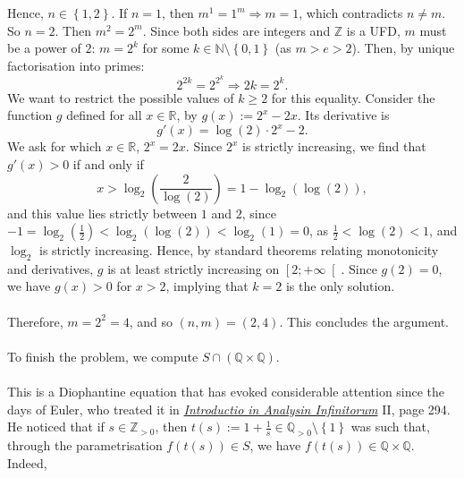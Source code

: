 \begin{solution}
    \\\\
    Hence, \( n \in \left\{ 1,2 \right\} \). If \( n = 1 \), then \( m^1 = 1^m \Rightarrow m = 1 \), which contradicts \( n \neq m \). So \( n = 2 \). Then \( m^2 = 2^m \). Since both sides are integers and \( \mathbb{Z} \) is a UFD, \( m \) must be a power of \( 2 \): \( m = 2^k \) for some \( k \in \mathbb{N} \setminus \left\{ 0,1 \right\} \) (as \( m > e > 2 \)). Then, by unique factorisation into primes:
    \[
        2^{2k} = 2^{2^k} \Rightarrow 2k = 2^k.
    \]
    We want to restrict the possible values of \( k\geq 2 \) for this equality. Consider the function \( g \) defined for all \( x \in \mathbb{R} \), by \( g\left(x\right) := 2^x - 2x \). Its derivative is
    \[
        g'\left( x \right) = \log\left(2\right) \cdot 2^x - 2.
    \]
    We ask for which \( x \in \mathbb{R} \), \( 2^x = 2x \). Since \( 2^x \) is strictly increasing, we find that \( g'\left(x\right) > 0 \) if and only if
    \[
        x > \log_2\left( \frac{2}{\log\left(2\right)} \right) = 1 - \log_2\left( \log\left(2\right) \right),
    \]
    and this value lies strictly between \( 1 \) and \( 2 \), since \( -1 = \log_2\left( \frac{1}{2} \right) < \log_2\left( \log\left(2\right) \right) < \log_2\left(1\right) = 0 \), as \( \frac{1}{2} < \log\left(2\right) < 1 \), and \( \log_2 \) is strictly increasing. Hence, by standard theorems relating monotonicity and derivatives, \( g \) is at least strictly increasing on \( \left[2;+\infty\right[ \). Since \( g\left(2\right) = 0 \), we have \( g\left(x\right) > 0 \) for \( x > 2 \), implying that \( k = 2 \) is the only solution.
    \\\\
    Therefore, \( m = 2^2 = 4 \), and so \( \left( n,m \right) = \left( 2,4 \right) \). This concludes the argument.
    \\\\
    To finish the problem, we compute \( S \cap \left( \mathbb{Q} \times \mathbb{Q} \right) \).
    \\\\
    This is a Diophantine equation that has evoked considerable attention since the days of Euler, who treated it in \href{https://en.wikipedia.org/wiki/Introductio_in_analysin_infinitorum}{\textit{Introductio in Analysin Infinitorum}} II, page 294. He noticed that if \( s \in \mathbb{Z}_{>0} \), then \( t\left(s\right) := 1 + \frac{1}{s} \in \mathbb{Q}_{>0} \setminus \left\{ 1 \right\} \) was such that, through the parametrisation \( f\left( t\left(s\right) \right) \in S \), we have \( f\left( t\left(s\right) \right) \in \mathbb{Q} \times \mathbb{Q} \). Indeed,

\end{solution}
